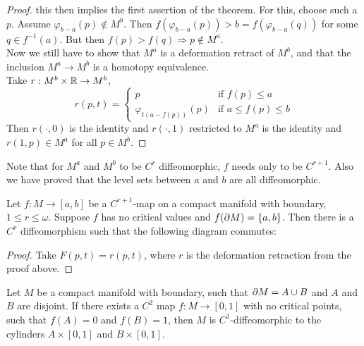 \begin{proof}
   this then implies the first assertion of the theorem. For this, choose such a
   $p$. Assume $\varphi_{b-a}(p) \notin M^b$. Then 
   $f(\varphi_{b-a}(p)) > b = f(\varphi_{b-a}(q))$ for some $q \in f^{-1}(a)$.
   But then $f(p) > f(q) \Rightarrow p \notin M^a$. \\
   Now we still have to show that $M^a$ is a deformation retract of $M^b$, and 
   that the inclusion $M^a \rightarrow M^b$ is a homotopy equivalence. \\
   Take $r: M^b \times {\mathbb R} \rightarrow M^b$, 
   \[ 
      r(p, t) = \begin{cases}
         p & \text{if } f(p) \leq a \\
         \varphi_{t(a - f(p))}(p) & \text{if } a \leq f(p) \leq b
      \end{cases}
   \]
   Then $r(\cdot, 0)$ is the identity and $r(\cdot, 1)$ restricted to $M^a$ is
   the identity and $r(1, p) \in M^a$ for all $p \in M^b$. 
\end{proof}

\begin{remark}
   Note that for $M^a$ and $M^b$ to be $C^r$ diffeomorphic, $f$ needs only to be
   $C^{r+1}$. Also we have proved that the level sets between $a$ and $b$ are
   all diffeomorphic.
\end{remark}

\begin{corollary}[Hirsch]
   Let $f: M \rightarrow [a, b]$ be a $C^{r+1}$-map on a compact manifold with 
   boundary, $1 \leq r \leq \omega$. Suppose $f$ has no critical values and 
   $f({\partial} M) = \{a, b\}$. Then there is a $C^r$ diffeomorphism such that the 
   following diagram commutes:
   \begin{figure}[H]
      \centering
   \end{figure}
\end{corollary}

\begin{proof}
   Take $F(p,t) = r(p, t)$, where $r$ is the deformation retraction from the 
   proof above.
\end{proof}

\begin{corollary}[Hirsch]
   Let $M$ be a compact manifold with boundary, such that ${\partial} M = A \cup B$
   and $A$ and $B$ are disjoint. If there exists a $C^2$ map $f: M \rightarrow [0,1]$
   with no critical points, such that $f(A) = 0$ and $f(B) = 1$, then $M$ is 
   $C^1$-diffeomorphic to the cylinders $A \times [0, 1]$ and $B \times [0, 1]$.
\end{corollary}
